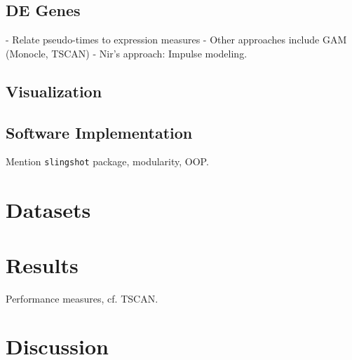 \documentclass[11pt]{article}\usepackage[]{graphicx}\usepackage[]{color}
\begin{document}
\subsection{DE Genes}
- Relate pseudo-times to expression measures
- Other approaches include GAM (Monocle, TSCAN)
- Nir's approach: Impulse modeling. 


\subsection{Visualization}


\subsection{Software Implementation}
Mention \texttt{slingshot} package, modularity, OOP.

\section{Datasets}

\section{Results}
Performance measures, cf. TSCAN.

\section{Discussion}
\end{document}
